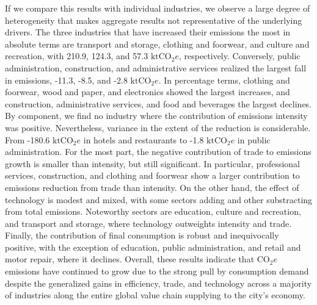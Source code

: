 \documentclass[
  10pt,
  twocolumn]{aft}
\begin{document}
If we compare this results with individual industries, we observe a
large degree of heterogeneity that makes aggregate results not
representative of the underlying drivers. The three industries that have
increased their emissions the most in absolute terms are transport and
storage, clothing and foorwear, and culture and recreation, with 210.9,
124.3, and 57.3 \(\text{ktCO}_2e\), respectively. Conversely, public
administration, construction, and administrative services realized the
largest fall in emissions, -11.3, -8.5, and -2.8 \(\text{ktCO}_2e\). In
percentage terms, clothing and foorwear, wood and paper, and electronics
showed the largest increases, and construction, administrative services,
and food and beverages the largest declines. By component, we find no
industry where the contribution of emissions intensity was positive.
Nevertheless, variance in the extent of the reduction is considerable.
From -180.6 \(\text{ktCO}_2e\) in hotels and restaurants to -1.8
\(\text{ktCO}_2e\) in public administration. For the most part, the
negative contribution of trade to emissions growth is smaller than
intensity, but still significant. In particular, professional services,
construction, and clothing and foorwear show a larger contribution to
emissions reduction from trade than intensity. On the other hand, the
effect of technology is modest and mixed, with some sectors adding and
other substracting from total emissions. Noteworthy sectors are
education, culture and recreation, and transport and storage, where
technology outweights intensity and trade. Finally, the contribution of
final consumption is robust and inequivocally positive, with the
exception of education, public administration, and retail and motor
repair, where it declines. Overall, these results indicate that
\(\text{CO}_2e\) emissions have continued to grow due to the strong pull
by consumption demand despite the generalized gains in efficiency,
trade, and technology across a majority of industries along the entire
global value chain supplying to the city's economy.
\end{document}
